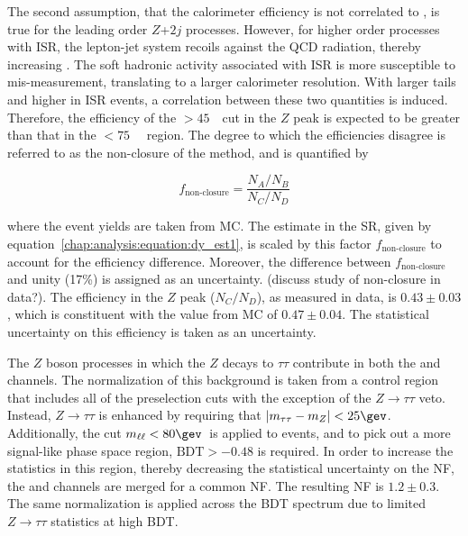 The second assumption, that the calorimeter \etmiss efficiency is not
correlated to \mll, is true for the leading order $Z$+$2j$
processes. However, for higher order processes with ISR, the
lepton-jet system recoils against the QCD radiation, thereby
increasing \mll. The soft hadronic activity associated with ISR is
more susceptible to mis-measurement, translating to a larger calorimeter
\etmiss resolution. With larger \etmiss tails and higher \mll in ISR
events, a correlation between these two quantities is
induced. Therefore, the efficiency of the \calomet$>45$~\gev~cut in the $Z$ peak is expected
to be greater than that in the \mll$<75$~\gev~ region. The degree to
which the efficiencies disagree is referred to as the non-closure of
the method, and is quantified by

\begin{equation}
f_{\textrm{non-closure}} = \frac{N_A/N_B}{N_C/N_D}
\label{chap:analysis:equation:abcd_nonclosure}
\end{equation}

\noindent
where the event yields are taken from \ZDY MC. The \ZDY estimate in
the SR, given by equation~\ref{chap:analysis:equation:dy_est1}, is
scaled by this factor $f_{\textrm{non-closure}}$ to account for the
\etmiss efficiency difference. Moreover, the difference between
$f_{\textrm{non-closure}}$ and unity (17\%) is assigned as an
uncertainty. (discuss study of non-closure in data?). The \etmiss
efficiency in the $Z$ peak ($N_C/N_D$), as measured in data, is $0.43
\pm 0.03$, which is constituent with the value from \ZDY MC of $0.47
\pm 0.04$. The statistical uncertainty on this efficiency is taken as
an uncertainty.

The $Z$ boson processes in which the $Z$ decays to $\tau\tau$
contribute in both the \emme and \eemm channels. The normalization of
this background is taken from a control region that includes all of
the preselection cuts with the exception of the
$Z\rightarrow{\tau\tau}$ veto. Instead, $Z\rightarrow{\tau\tau}$ is
enhanced by requiring that $|\mtt - m_Z| < 25 \gev$. Additionally, the
cut $\mll < 80 \gev$~is applied to \eemm events, and to pick out a
more signal-like phase space region, $\textrm{BDT} > -0.48$ is
required. In order to increase the statistics in this region, thereby
decreasing the statistical uncertainty on the NF, the \emme and \eemm
channels are merged for a common NF. The resulting NF is $1.2 \pm
0.3$. The same normalization is applied across the BDT spectrum due to
limited $Z\rightarrow{\tau\tau}$ statistics at high BDT. 
